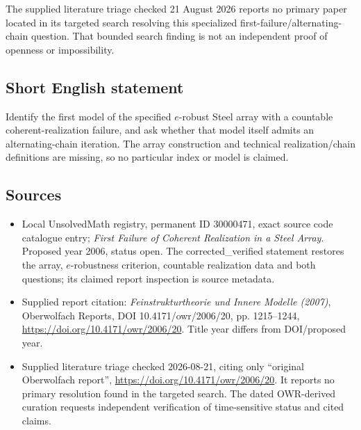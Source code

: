 \documentclass[11pt]{article}
\begin{document}
The supplied literature triage checked 21 August 2026 reports no primary paper located in its targeted search resolving this specialized first-failure/alternating-chain question. That bounded search finding is not an independent proof of openness or impossibility.
\subsection{Short English statement}
Identify the first model of the specified $e$-robust Steel array with a countable coherent-realization failure, and ask whether that model itself admits an alternating-chain iteration. The array construction and technical realization/chain definitions are missing, so no particular index or model is claimed.
\subsection{Sources}
\begin{itemize}
\item Local UnsolvedMath registry, permanent ID 30000471, exact source code catalogue entry; \emph{First Failure of Coherent Realization in a Steel Array}. Proposed year 2006, status open. The corrected\_verified statement restores the array, $e$-robustness criterion, countable realization data and both questions; its claimed report inspection is source metadata.
\item Supplied report citation: \emph{Feinstrukturtheorie und Innere Modelle (2007)}, Oberwolfach Reports, DOI 10.4171/owr/2006/20, pp. 1215--1244, \url{https://doi.org/10.4171/owr/2006/20}. Title year differs from DOI/proposed year.
\item Supplied literature triage checked 2026-08-21, citing only ``original Oberwolfach report'', \url{https://doi.org/10.4171/owr/2006/20}. It reports no primary resolution found in the targeted search. The dated OWR-derived curation requests independent verification of time-sensitive status and cited claims.
\end{itemize}
\end{document}

